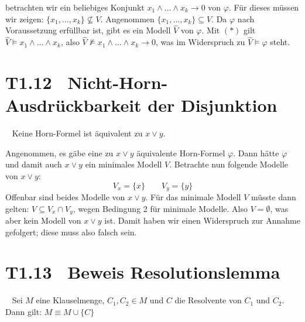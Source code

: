 \documentclass[fontsize=11pt, twoside=false, numbers=autoenddot]{scrbook}
\begin{document}
\begin{beweis}
\begin{description}
      betrachten wir ein beliebiges Konjunkt $x_1 \land \dots \land x_k \to 0$ von $\varphi$.
      Für dieses müssen wir zeigen: $\{x_1,\dots,x_k\} \nsubseteq V$.
      Angenommen $\{x_1,\dots,x_k\} \subseteq V$.
      Da $\varphi$ nach Voraussetzung erfüllbar ist,
      gibt es ein Modell $\widehat V$ von $\varphi$.
      Mit $(*)$ gilt $\widehat V \models x_1 \land \dots \land x_k$,
      also $\widehat V \not\models x_1 \land \dots \land x_k \to 0$,
      was im Widerspruch zu $\widehat V \models \varphi$ steht.\qedhere
  \end{description}
\end{beweis}%

\section*{T1.12~ Nicht-Horn-Ausdrückbarkeit der Disjunktion}

\enlargethispage{7mm}
~
Keine Horn-Formel ist äquivalent zu $x \lor y$.

\par\noindent
\begin{beweis}
  Angenommen, es gäbe eine zu $x \lor y$ äquivalente Horn-Formel $\varphi$.
  Dann hätte $\varphi$ und damit auch $x \lor y$ ein minimales Modell $V$.
  Betrachte nun folgende Modelle von $x \lor y$:
  \[
    V_x = \{x\} \qquad V_y = \{y\}
  \]
  Offenbar sind beides Modelle von $x \lor y$.
  Für das minimale Modell $V$ müsste dann gelten:
  $V \subseteq V_x \cap V_y$, wegen Bedingung 2 für minimale Modelle.
  Also $V = \emptyset$, was aber kein Modell von $x \lor y$ ist.
  Damit haben wir einen Widerspruch zur Annahme gefolgert;
  diese muss also falsch sein.\qedhere
\end{beweis}%

\section*{T1.13~ Beweis Resolutionslemma}

~
Sei $M$ eine Klauselmenge, $C_1, C_2 \in M$ und $C$ die Resolvente von $C_1$ und $C_2$.
Dann gilt: $M \equiv M \cup \{C\}$
\end{document}
